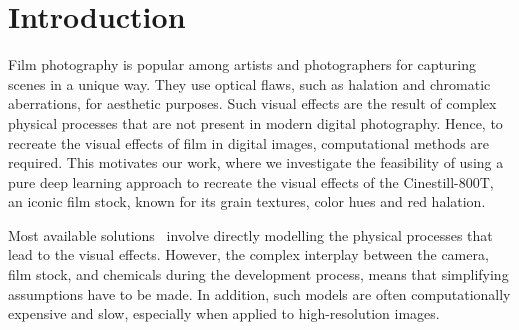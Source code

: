 \section{Introduction}
\label{sec:introduction}


Film photography is popular among artists and photographers for capturing scenes
in a unique way. They use optical flaws, such as halation and chromatic
aberrations, for aesthetic purposes. Such visual effects are the result of
complex physical processes that are not present in modern digital photography.
Hence, to recreate the visual effects of film in digital images, computational
methods are required. This motivates our work, where we investigate the
feasibility of using a pure deep learning approach to recreate the visual
effects of the Cinestill-800T, an iconic film stock, known for its grain
textures, color hues and red halation.


Most available solutions~\cite{film-grain-rendering} involve directly modelling
the physical processes that lead to the visual effects. However, the complex
interplay between the camera, film stock, and chemicals during the development
process, means that simplifying assumptions have to be made. In addition, such
models are often computationally expensive and slow, especially when applied to
high-resolution images.

